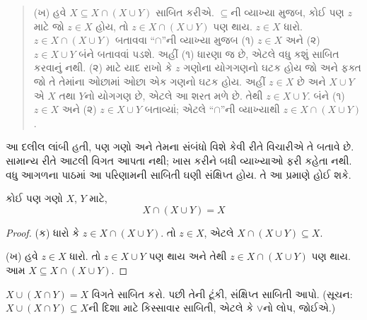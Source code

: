 \begin{explain}
\begin{quote}
(ખ) હવે $X \subseteq X \cap (X \cup Y)$ સાબિત કરીએ.
$\subseteq$ની વ્યાખ્યા મુજબ, કોઈ પણ $z$ માટે
જો $z \in X$ હોય, તો $z \in X \cap (X \cup Y)$ પણ થાય.
$z \in X$ ધારો. $z \in X \cap (X \cup Y)$ બતાવવા
``$\cap$''ની વ્યાખ્યા મુજબ (૧) $z \in X$ અને
(૨) $z \in X \cup Y$ બંને બતાવવાં પડશે.
અહીં (૧) ધારણા જ છે, એટલે વધુ કશું સાબિત કરવાનું નથી.
(૨) માટે યાદ રાખો કે $z$ ગણોના યોગગણનો ઘટક હોય
જો અને ફક્ત જો તે તેમાંના ઓછામાં ઓછા એક ગણનો ઘટક હોય.
અહીં $z \in X$ છે અને $X \cup Y$ એ $X$ તથા $Y$નો યોગગણ છે,
એટલે આ શરત મળે છે. તેથી $z \in X \cup Y$.
બંને (૧) $z \in X$ અને (૨) $z \in X \cup Y$ બતાવ્યાં;
એટલે ``$\cap$''ની વ્યાખ્યાથી $z \in X \cap (X \cup Y)$.
\end{quote}

આ દલીલ લાંબી હતી, પણ ગણો અને તેમના સંબંધો વિશે કેવી રીતે
વિચારીએ તે બતાવે છે. સામાન્ય રીતે આટલી વિગત આપતા નથી;
ખાસ કરીને બધી વ્યાખ્યાઓ ફરી કહેતા નથી.
વધુ આગળના પાઠમાં આ પરિણામની સાબિતી ઘણી સંક્ષિપ્ત હોય.
તે આ પ્રમાણે હોઈ શકે.
\end{explain}

\begin{prop}[અવશોષણ]
કોઈ પણ ગણો $X$, $Y$ માટે,
\[
X \cap (X \cup Y) = X
\]
\end{prop}

\begin{proof}
(ક) ધારો કે $z \in X \cap (X \cup Y)$.
તો $z \in X$, એટલે $X \cap (X \cup Y) \subseteq X$.

(ખ) હવે $z \in X$ ધારો.
તો $z \in X \cup Y$ પણ થાય અને તેથી
$z \in X \cap (X \cup Y)$ પણ થાય.
આમ $X \subseteq X \cap (X \cup Y)$.
\end{proof}

\begin{prob}
$X \cup (X \cap Y) = X$ વિગતે સાબિત કરો.
પછી તેની ટૂંકી, સંક્ષિપ્ત સાબિતી આપો.
(સૂચન: $X \cup (X \cap Y) \subseteq X$ની દિશા માટે
કિસ્સાવાર સાબિતી, એટલે કે $\lor$નો લોપ, જોઈએ.)
\end{prob}
\endgroup
\endgroup


\begingroup
\makeatletter{}\makeatother

\label{guunit:OLP-0011}


\begingroup
\makeatletter{}\makeatother

\label{guunit:OLP-0012}


